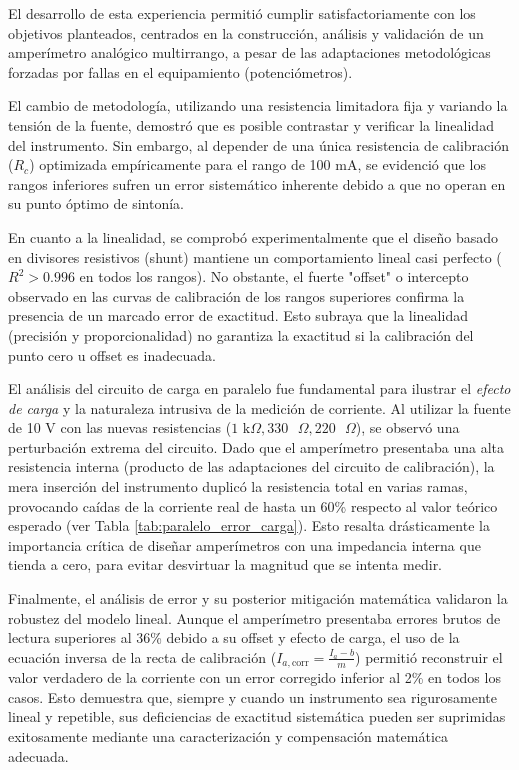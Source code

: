 \label{sec:conclusiones}

El desarrollo de esta experiencia permitió cumplir satisfactoriamente con los objetivos planteados, centrados en la construcción, análisis y validación de un amperímetro analógico multirrango, a pesar de las adaptaciones metodológicas forzadas por fallas en el equipamiento (potenciómetros). 

El cambio de metodología, utilizando una resistencia limitadora fija y variando la tensión de la fuente, demostró que es posible contrastar y verificar la linealidad del instrumento. Sin embargo, al depender de una única resistencia de calibración ($R_c$) optimizada empíricamente para el rango de 100 mA, se evidenció que los rangos inferiores sufren un error sistemático inherente debido a que no operan en su punto óptimo de sintonía.

En cuanto a la linealidad, se comprobó experimentalmente que el diseño basado en divisores resistivos (shunt) mantiene un comportamiento lineal casi perfecto ($R^2 > 0.996$ en todos los rangos). No obstante, el fuerte "offset" o intercepto observado en las curvas de calibración de los rangos superiores confirma la presencia de un marcado error de exactitud. Esto subraya que la linealidad (precisión y proporcionalidad) no garantiza la exactitud si la calibración del punto cero u offset es inadecuada.

El análisis del circuito de carga en paralelo fue fundamental para ilustrar el \textit{efecto de carga} y la naturaleza intrusiva de la medición de corriente. Al utilizar la fuente de 10 V con las nuevas resistencias ($1\text{ k}\Omega, 330\text{ }\Omega, 220\text{ }\Omega$), se observó una perturbación extrema del circuito. Dado que el amperímetro presentaba una alta resistencia interna (producto de las adaptaciones del circuito de calibración), la mera inserción del instrumento duplicó la resistencia total en varias ramas, provocando caídas de la corriente real de hasta un 60\% respecto al valor teórico esperado (ver Tabla \ref{tab:paralelo_error_carga}). Esto resalta drásticamente la importancia crítica de diseñar amperímetros con una impedancia interna que tienda a cero, para evitar desvirtuar la magnitud que se intenta medir.

Finalmente, el análisis de error y su posterior mitigación matemática validaron la robustez del modelo lineal. Aunque el amperímetro presentaba errores brutos de lectura superiores al 36\% debido a su offset y efecto de carga, el uso de la ecuación inversa de la recta de calibración ($I_{a,\text{corr}} = \frac{I_a - b}{m}$) permitió reconstruir el valor verdadero de la corriente con un error corregido inferior al 2\% en todos los casos. Esto demuestra que, siempre y cuando un instrumento sea rigurosamente lineal y repetible, sus deficiencias de exactitud sistemática pueden ser suprimidas exitosamente mediante una caracterización y compensación matemática adecuada.